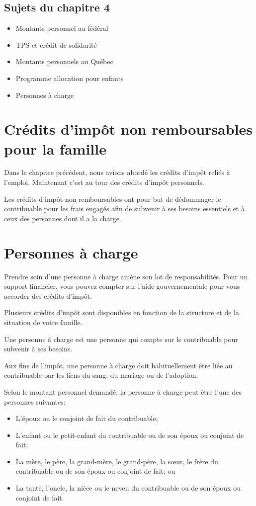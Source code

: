 \subsection{Sujets du chapitre 4}
\begin{itemize}
	\item Montants personnel au fédéral
	\item TPS et crédit de solidarité
	\item Montants personnels au Québec
	\item Programme allocation pour enfants
	\item Personnes à charge
\end{itemize}



\section{Crédits d'impôt non remboursables pour la famille}
\begin{intro}
	Dans le chapitre précédent, nous avions abordé les crédits d'impôt reliés à l'emploi. Maintenant c'est au tour des crédits d'impôt personnels. 
\end{intro}
Les crédits d'impôt non remboursables ont pour but de dédommager le contribuable pour les frais engagés afin de subvenir à ses besoins essentiels et à ceux des personnes dont il a la charge.



\section{Personnes à charge}
\begin{intro}
	Prendre soin d'une personne à charge amène son lot de responsabilités. Pour un support financier, vous pouvez compter sur l'aide gouvernementale pour vous accorder des crédits d'impôt.
	
	Plusieurs crédits d'impôt sont disponibles en fonction de la structure et de la situation de votre famille.
\end{intro}

Une \og personne à charge \fg{} est une personne qui compte sur le contribuable pour subvenir à ses besoins.

Aux fins de l'impôt, une personne à charge doit habituellement être liée au contribuable par les liens du sang, du mariage ou de l'adoption. 

Selon le montant personnel demandé, la personne à charge peut être l'une des personnes suivantes:
\begin{itemize}
	\item L'époux ou le conjoint de fait du contribuable;
	\item L'enfant ou le petit-enfant du contribuable ou de son époux ou conjoint de fait;
	\item La mère, le père, la grand-mère, le grand-père, la sœur, le frère du contribuable ou de son époux ou conjoint de fait; ou
	\item La tante, l'oncle, la nièce ou le neveu du contribuable ou de son époux ou conjoint de fait.
\end{itemize}

